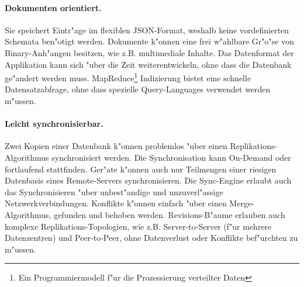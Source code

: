 \documentclass[a4paper,14pt]{scrreprt}
\begin{document}
\paragraph{Dokumenten orientiert.}
Sie speichert Eintr"age im flexiblen JSON-Format, weshalb keine vordefinierten Schemata ben"otigt werden. Dokumente k"onnen eine frei w"ahlbare Gr"o"se von Binary-Anh"angen besitzen, wie z.B. multimediale Inhalte. Das Datenformat der Applikation kann sich "uber die Zeit weiterentwickeln, ohne dass die Datenbank ge"andert werden muss. MapReduce\footnote[1]{Ein Programmiermodell f"ur die Prozessierung verteilter Daten} Indizierung bietet eine schnelle Datensatzabfrage, ohne dass spezielle Query-Languages verwendet werden m"ussen.

\paragraph{Leicht synchronisierbar.}
Zwei Kopien einer Datenbank k"onnen problemlos "uber einen Replikations-Algorithmus synchronisiert werden. Die Synchronisation kann On-Demand oder fortlaufend stattfinden. Ger"ate k"onnen auch nur Teilmengen einer riesigen Datenbasis eines Remote-Servers synchronisieren. Die Sync-Engine erlaubt auch das Synchronisieren "uber unbest"andige und unzuverl"assige Netzwerkverbindungen. Konflikte k"onnen einfach "uber einen Merge-Algorithmus, gefunden und behoben werden. Revisions-B"aume erlauben auch komplexe Replikations-Topologien, wie z.B. Server-to-Server (f"ur mehrere Datenzentren) und Peer-to-Peer, ohne Datenverlust oder Konflikte bef"urchten zu m"ussen.
\end{document}
